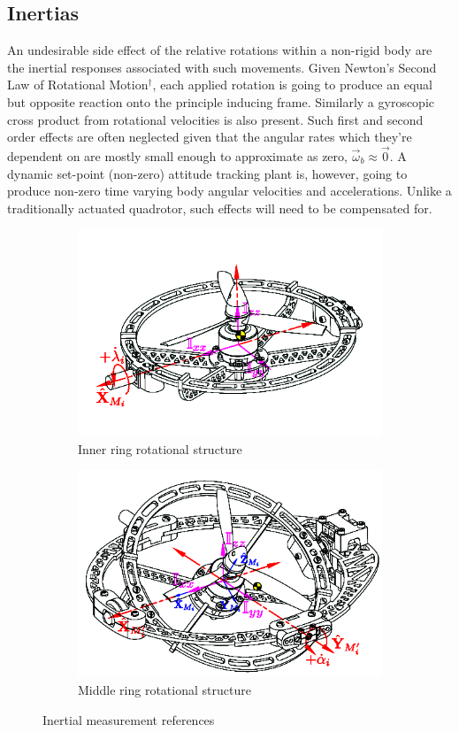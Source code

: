 \subsection*{Inertias}
An undesirable side effect of the relative rotations within a non-rigid body are the inertial responses associated with such movements. Given Newton's Second Law of Rotational Motion$^{\dagger}$, each applied rotation is going to produce an equal but opposite reaction onto the principle inducing frame. Similarly a gyroscopic cross product from rotational velocities is also present. Such first and second order effects are often neglected given that the angular rates which they're dependent on are mostly small enough to approximate as zero, $\vec{\omega}_b\approx\vec{0}$. A dynamic set-point (non-zero) attitude tracking plant is, however, going to produce non-zero time varying body angular velocities and accelerations. Unlike a traditionally actuated quadrotor, such effects will need to be compensated for.
\begin{figure}[htbp]
\centering
\begin{subfigure}{0.49\textwidth}
\includegraphics[width=\textwidth]{figs/inertia-inner}
\caption{Inner ring rotational structure}
\label{fig:inertia-inner}
\end{subfigure}
\begin{subfigure}{0.49\textwidth}
\includegraphics[width=\textwidth]{figs/inertia-middle}
\caption{Middle ring rotational structure}
\label{fig:inertia-middle}
\end{subfigure}
\caption{Inertial measurement references}
\end{figure}
